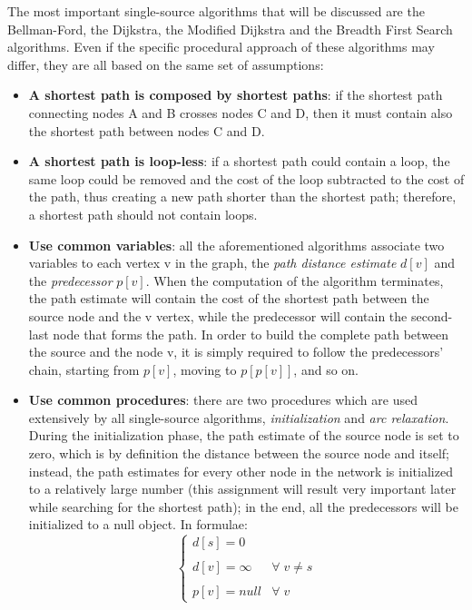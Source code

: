\documentclass[10pt,a4paper]{report}
\begin{document}
The most important single-source algorithms that will be discussed are
the Bellman-Ford, the Dijkstra, the Modified Dijkstra and the Breadth
First Search algorithms. Even if the specific procedural approach of
these algorithms may differ, they are all based on the same set of
assumptions:
\begin{itemize}
\item \textbf{A shortest path is composed by shortest paths}: if the
  shortest path connecting nodes A and B crosses nodes C and D, then
  it must contain also the shortest path between nodes C and D.
\item \textbf{A shortest path is loop-less}: if a shortest path could
  contain a loop, the same loop could be removed and the cost of the
  loop subtracted to the cost of the path, thus creating a new path
  shorter than the shortest path; therefore, a shortest path should
  not contain loops. 
\item \textbf{Use common variables}: all the aforementioned algorithms
  associate two variables to each vertex v in the graph, the
  \textit{path distance estimate} \(d[v]\) and the
  \textit{predecessor} \(p[v]\). When the computation of the algorithm
  terminates, the path estimate will contain the cost of the shortest
  path between the source node and the v vertex, while the predecessor
  will contain the second-last node that forms the path. In order to
  build the complete path between the source and the node v, it is
  simply required to follow the predecessors' chain, starting from
  \(p[v]\), moving to \(p[p[v]]\), and so on.
\item \textbf{Use common procedures}: there are two procedures which
  are used extensively by all single-source algorithms,
  \textit{initialization} and \textit{arc relaxation}. During the
  initialization phase, the path estimate of the source node is set to
  zero, which is by definition the distance between the source node
  and itself; instead, the path estimates for every other node in the
  network is initialized to a relatively large number (this assignment
  will result very important later while searching for the shortest
  path); in the end, all the predecessors will be initialized to a
  null object. In formulae:
  \[ \left\{
    \begin{array}{ll}
      d[s] = 0 & \\\\
      d[v] = \infty & \forall \; v \neq s \\\\
      p[v] = null & \forall \; v
    \end{array}\right. \]
    

\end{itemize}
\end{document}
